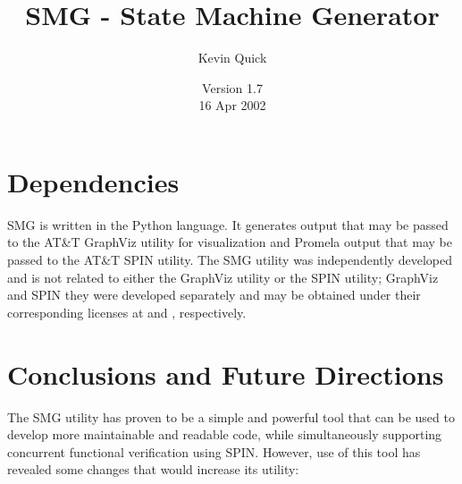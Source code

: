 \documentclass[runningheads]{llncs}
\title{SMG - State Machine Generator}
\author{Kevin Quick\inst{1}}
\institute{\email{quick@null.net}}
\date{Version 1.7 \\ 16 Apr 2002}
\begin{document}
\maketitle






\section{Dependencies}

SMG is written in the Python language.  It generates output that may
be passed to the AT\&T GraphViz utility for visualization and Promela
output that may be passed to the AT\&T SPIN utility.  The SMG utility
was independently developed and is not related to either the GraphViz
utility or the SPIN utility; GraphViz and SPIN they were developed
separately and may be obtained under their corresponding licenses at
 and
,
respectively.

\section{Conclusions and Future Directions}

The SMG utility has proven to be a simple and powerful tool that can
be used to develop more maintainable and readable code, while
simultaneously supporting concurrent functional verification using
SPIN.  However, use of this tool has revealed some changes that would
increase its utility:
\end{document}
